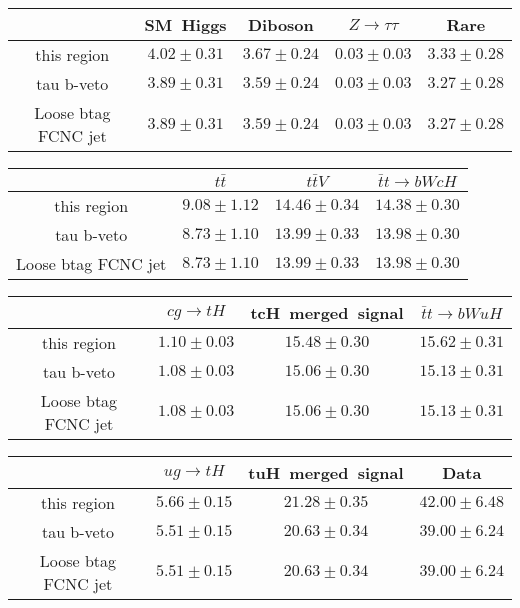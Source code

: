 \centering
\begin{tabular}{|c|c|c|c|c|} \hline
 & SM~Higgs & Diboson & $Z\to \tau\tau$ & Rare\\\hline
this region & $4.02\pm0.31$ & $3.67\pm0.24$ & $0.03\pm0.03$ & $3.33\pm0.28$\\\hline
tau b-veto & $3.89\pm0.31$ & $3.59\pm0.24$ & $0.03\pm0.03$ & $3.27\pm0.28$\\\hline
Loose btag FCNC jet & $3.89\pm0.31$ & $3.59\pm0.24$ & $0.03\pm0.03$ & $3.27\pm0.28$\\\hline
\end{tabular}
\begin{tabular}{|c|c|c|c|} \hline
 & $t\bar{t}$ & $t\bar{t}V$ & $\bar{t}t\to bWcH$\\\hline
this region & $9.08\pm1.12$ & $14.46\pm0.34$ & $14.38\pm0.30$\\\hline
tau b-veto & $8.73\pm1.10$ & $13.99\pm0.33$ & $13.98\pm0.30$\\\hline
Loose btag FCNC jet & $8.73\pm1.10$ & $13.99\pm0.33$ & $13.98\pm0.30$\\\hline
\end{tabular}
\begin{tabular}{|c|c|c|c|} \hline
 & $cg\to tH$ & tcH~merged~signal & $\bar{t}t\to bWuH$\\\hline
this region & $1.10\pm0.03$ & $15.48\pm0.30$ & $15.62\pm0.31$\\\hline
tau b-veto & $1.08\pm0.03$ & $15.06\pm0.30$ & $15.13\pm0.31$\\\hline
Loose btag FCNC jet & $1.08\pm0.03$ & $15.06\pm0.30$ & $15.13\pm0.31$\\\hline
\end{tabular}
\begin{tabular}{|c|c|c|c|} \hline
 & $ug\to tH$ & tuH~merged~signal & Data\\\hline
this region & $5.66\pm0.15$ & $21.28\pm0.35$ & $42.00\pm6.48$\\\hline
tau b-veto & $5.51\pm0.15$ & $20.63\pm0.34$ & $39.00\pm6.24$\\\hline
Loose btag FCNC jet & $5.51\pm0.15$ & $20.63\pm0.34$ & $39.00\pm6.24$\\\hline
\end{tabular}
